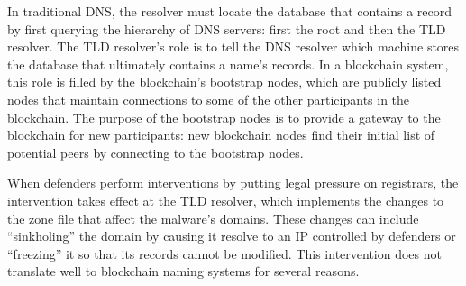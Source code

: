

In traditional DNS, the resolver must locate the database 
that contains a record by first querying the hierarchy of DNS 
servers: first the root and then the TLD resolver. The TLD 
resolver's role is to tell the DNS resolver which machine 
stores the database that ultimately contains a name's 
records. In a blockchain system, this role is filled by the 
blockchain's bootstrap nodes, which are publicly listed 
nodes that maintain connections to some of the other 
participants in the blockchain. The purpose of the bootstrap 
nodes is to provide a gateway to the blockchain for new 
participants: new blockchain nodes find their initial list of 
potential peers by connecting to the bootstrap nodes.

When defenders perform interventions by putting legal 
pressure on registrars, the intervention takes effect at the 
TLD resolver, which implements the changes to the zone file 
that affect the malware's domains. These changes can include 
``sinkholing'' the domain by causing it resolve to an IP 
controlled by defenders or ``freezing'' it so that 
its records cannot be modified. This intervention does not 
translate well to blockchain naming systems for several 
reasons. 

